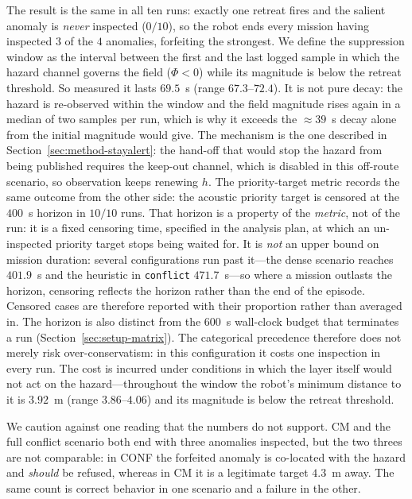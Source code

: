 The result is the same in all ten runs: exactly one retreat fires and the salient
anomaly is \emph{never} inspected ($0/10$), so the robot ends every mission having
inspected $3$ of the $4$ anomalies, forfeiting the strongest. We define the
suppression window as the interval between the first and the last logged sample in
which the hazard channel governs the field ($\Phi<0$) while its magnitude is below the
retreat threshold. So measured it lasts $69.5$~s (range $67.3$--$72.4$). It is not
pure decay: the hazard is re-observed within the window and the field magnitude rises
again in a median of two samples per run, which is why it exceeds the ${\approx}39$~s
decay alone from the initial magnitude would give. The mechanism is the one described
in Section~\ref{sec:method-stayalert}: the hand-off that would stop the hazard from being
published requires the keep-out channel, which is disabled in this off-route
scenario, so observation keeps renewing $h$. The
priority-target metric records the same outcome from the other side: the acoustic
priority target is censored at the $400$~s horizon in $10/10$ runs. That horizon is
a property of the \emph{metric}, not of the run: it is a fixed censoring time,
specified in the analysis plan, at which an un-inspected priority target stops being
waited for. It is \emph{not} an upper bound on mission duration:
several configurations run past it---the dense scenario reaches $401.9$~s and the
heuristic in \texttt{conflict} $471.7$~s---so where a mission outlasts the horizon,
censoring reflects the horizon rather than the end of the episode. Censored cases
are therefore reported with their proportion rather than averaged in. The horizon is
also distinct from the $600$~s wall-clock budget that terminates a run
(Section~\ref{sec:setup-matrix}). The categorical precedence therefore does not merely risk over-conservatism: in this
configuration it costs one inspection in every run. The cost is incurred under
conditions in which the layer itself would not act on the hazard---throughout the
window the robot's minimum distance to it is $3.92$~m (range $3.86$--$4.06$) and its
magnitude is below the retreat threshold.

We caution against one reading that the numbers do not support. CM and the full conflict
scenario both end with three anomalies inspected, but the two threes are not
comparable: in CONF the forfeited anomaly is co-located with the hazard and
\emph{should} be refused, whereas in CM it is a legitimate target $4.3$~m away. The
same count is correct behavior in one scenario and a failure in the other.

